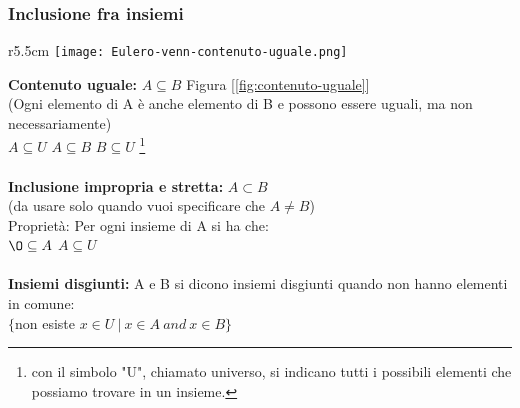 \subsubsection{Inclusione fra insiemi}
\begin{wrapfigure}{r}{5.5cm}
    \vspace{-10pt}
    \texttt{[image: Eulero-venn-contenuto-uguale.png]}
    \caption{Contenuto uguale}
    \label{fig:contenuto-uguale}
\end{wrapfigure}
\textbf{Contenuto uguale:} $A \subseteq B$ \hspace{.3cm} Figura [\ref{fig:contenuto-uguale}] \\(Ogni elemento di A è anche elemento di B e possono essere uguali, ma non necessariamente) \\
$A \subseteq U$ \hspace{.3cm} $A \subseteq B$ \hspace{.3cm} $B \subseteq U$ \footnote{con il simbolo "U", chiamato universo, si indicano tutti i possibili elementi che possiamo trovare in un insieme.} \\ \\
\textbf{Inclusione impropria e stretta:} $A \subset B$ \hspace{.2cm} \\(da usare solo quando vuoi specificare che $A \neq B$) \\
Proprietà: Per ogni insieme di A si ha che:\\
$\O \subseteq A$ \hspace{.2cm} $A \subseteq U$ \\ \\
\textbf{Insiemi disgiunti:} A e B si dicono insiemi disgiunti quando non hanno elementi in comune: \\
$\{$non esiste $x \in U \: | \: x \in A \: and \: x \in B\}$\\

